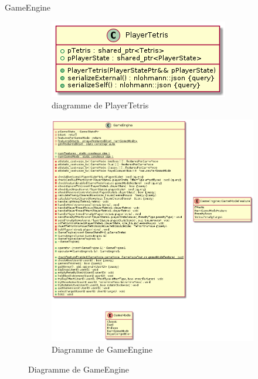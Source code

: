 \documentclass{beamer}
\begin{document}
\begin{frame}{GameEngine}
\begin{figure}
\hfill
\begin{subfigure}{0.2\textwidth}
    \includegraphics[width=\textwidth]{../../res/uml/class/PlayerTetrisClass.png}
    \caption{diagramme de PlayerTetris}
    \label{fig:third}
\end{subfigure}
\hfill
\begin{subfigure}{0.4\textwidth}
    \includegraphics[width=\textwidth]{../../res/uml/class/GameEngineClass.png}
    \caption{Diagramme de GameEngine}
    \label{fig:first}
\end{subfigure}

\end{figure}

\end{frame}
\end{document}
